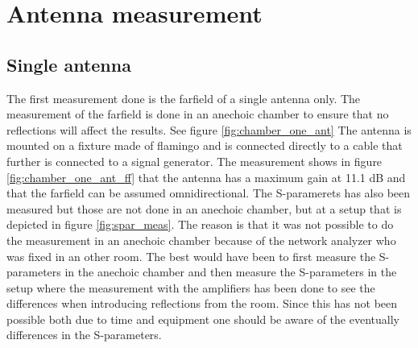 \chapter{Antenna measurement}\label{ch:ant_meas}

\section{Single antenna}
The first measurement done is the farfield of a single antenna only. The measurement  of the farfield is done in an anechoic chamber to ensure that no reflections will affect the results. See figure \ref{fig:chamber_one_ant} The antenna is mounted on a fixture made of flamingo and is connected directly to a cable that further is connected to a signal generator. The measurement shows in figure \ref{fig:chamber_one_ant_ff} that the antenna has a maximum gain at 11.1 dB and that the farfield can be assumed omnidirectional. The S-paramerets has also been measured but those are not done in an anechoic chamber, but at a setup that is depicted in figure \ref{fig:spar_meas}. The reason is that it was not possible to do the measurement in an anechoic chamber because of the network analyzer who was fixed in an other room. The best would have been to first measure the S-parameters in the anechoic chamber and then measure the S-parameters in the setup where the measurement with the amplifiers has been done to see the differences when introducing reflections from the room. Since this has not been possible both due to time and equipment one should be aware of the eventually differences in the S-parameters.     

